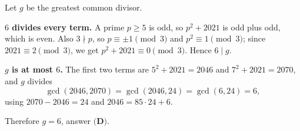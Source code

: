 Let $g$ be the greatest common divisor.

\textbf{$6$ divides every term.} A prime $p\ge5$ is odd, so $p^2+2021$ is odd plus odd, which is even. Also $3\nmid p$, so $p\equiv\pm1\pmod3$ and $p^2\equiv1\pmod3$; since $2021\equiv2\pmod3$, we get $p^2+2021\equiv0\pmod3$. Hence $6\mid g$.

\textbf{$g$ is at most $6$.} The first two terms are $5^2+2021=2046$ and $7^2+2021=2070$, and $g$ divides
\[\gcd(2046,2070)=\gcd(2046,24)=\gcd(6,24)=6,\]
using $2070-2046=24$ and $2046=85\cdot24+6$.

Therefore $g=\boxed{6}$, answer $\textbf{(D)}$.
